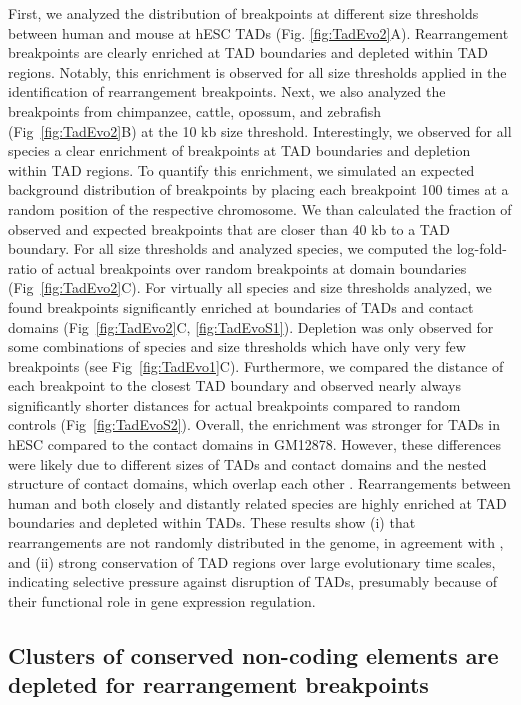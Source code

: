 \documentclass[a4paper,twoside=true,openright,parskip=full,chapterprefix=true,11pt,headings=normal,bibliography=totoc,listof=totoc,titlepage=on,captions=tableabove,draft=false]{scrreprt}
\theoremstyle{definition}
\theoremstyle{definition}
\theoremstyle{definition}
\theoremstyle{remark}
\begin{document}
First, we analyzed the distribution of breakpoints at different size
thresholds between human and mouse at hESC TADs (Fig.
\ref{fig:TadEvo2}A). Rearrangement breakpoints are clearly enriched at
TAD boundaries and depleted within TAD regions. Notably, this enrichment
is observed for all size thresholds applied in the identification of
rearrangement breakpoints. Next, we also analyzed the breakpoints from
chimpanzee, cattle, opossum, and zebrafish (Fig~\ref{fig:TadEvo2}B) at
the 10 kb size threshold. Interestingly, we observed for all species a
clear enrichment of breakpoints at TAD boundaries and depletion within
TAD regions. To quantify this enrichment, we simulated an expected
background distribution of breakpoints by placing each breakpoint 100
times at a random position of the respective chromosome. We than
calculated the fraction of observed and expected breakpoints that are
closer than 40 kb to a TAD boundary. For all size thresholds and
analyzed species, we computed the log-fold-ratio of actual breakpoints
over random breakpoints at domain boundaries (Fig~\ref{fig:TadEvo2}C).
For virtually all species and size thresholds analyzed, we found
breakpoints significantly enriched at boundaries of TADs and contact
domains (Fig~\ref{fig:TadEvo2}C, \ref{fig:TadEvoS1}). Depletion was only
observed for some combinations of species and size thresholds which have
only very few breakpoints (see Fig~\ref{fig:TadEvo1}C). Furthermore, we
compared the distance of each breakpoint to the closest TAD boundary and
observed nearly always significantly shorter distances for actual
breakpoints compared to random controls (Fig~\ref{fig:TadEvoS2}).
Overall, the enrichment was stronger for TADs in hESC compared to the
contact domains in GM12878. However, these differences were likely due
to different sizes of TADs and contact domains and the nested structure
of contact domains, which overlap each other \citep{Rao2014}.
Rearrangements between human and both closely and distantly related
species are highly enriched at TAD boundaries and depleted within TADs.
These results show (i) that rearrangements are not randomly distributed
in the genome, in agreement with \citep{Farre2015}, and (ii) strong
conservation of TAD regions over large evolutionary time scales,
indicating selective pressure against disruption of TADs, presumably
because of their functional role in gene expression regulation.

\hypertarget{clusters-of-conserved-non-coding-elements-are-depleted-for-rearrangement-breakpoints}{%
\subsection{Clusters of conserved non-coding elements are depleted for
rearrangement
breakpoints}\label{clusters-of-conserved-non-coding-elements-are-depleted-for-rearrangement-breakpoints}}
\end{document}
